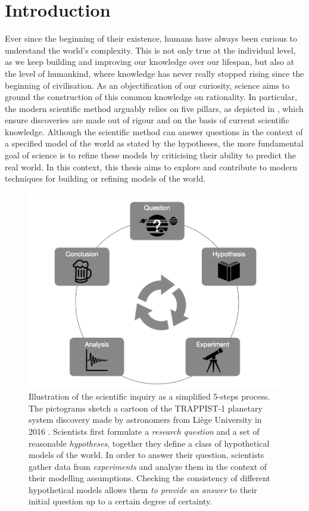 \chapter{Introduction}\label{ch:introduction}
Ever since the beginning of their existence, humans have always been curious to understand the world's complexity. This is not only true at the individual level, as we keep building and improving our knowledge over our lifespan, but also at the level of humankind, where knowledge has never really stopped rising since the beginning of civilisation. As an objectification of our curiosity, science aims to ground the construction of this common knowledge on rationality. In particular, the modern scientific method arguably relies on five pillars, as depicted in , which ensure discoveries are made out of rigour and on the basis of current scientific knowledge. Although the scientific method can answer questions in the context of a specified model of the world as stated by the hypotheses, the more fundamental goal of science is to refine these models by criticising their ability to predict the real world. In this context, this thesis aims to explore and contribute to modern techniques for building or refining models of the world.

\begin{figure}[h!]
  \centering
  \includegraphics[width=.8\textwidth]{figures/chapter01/trapist_disco.png}
  \caption{
  Illustration of the scientific inquiry as a simplified 5-steps process. The pictograms sketch a cartoon of the TRAPPIST-1 planetary system discovery made by astronomers from Li{\`e}ge University in 2016 \citep{gillon2017seven}.  Scientists first formulate a \textit{research question} and a set of reasonable \textit{hypotheses}, together they define a class of hypothetical models of the world. In order to answer their question, scientists gather data from \textit{experiments} and analyze them in the context of their modelling assumptions. Checking the consistency of different hypothetical models allows them \textit{to provide an answer} to their initial question up to a certain degree of certainty.}
  \label{fig:ch01:scientific_method}
\end{figure}

